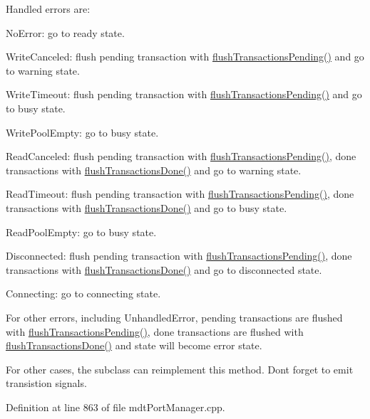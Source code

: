 Handled errors are\-:
\begin{DoxyItemize}
\item No\-Error\-: go to ready state.
\item Write\-Canceled\-: flush pending transaction with \hyperlink{classmdt_port_manager_a85b87522eb9ec9b80ff24e3ad2ef4a00}{flush\-Transactions\-Pending()} and go to warning state.
\item Write\-Timeout\-: flush pending transaction with \hyperlink{classmdt_port_manager_a85b87522eb9ec9b80ff24e3ad2ef4a00}{flush\-Transactions\-Pending()} and go to busy state.
\item Write\-Pool\-Empty\-: go to busy state.
\item Read\-Canceled\-: flush pending transaction with \hyperlink{classmdt_port_manager_a85b87522eb9ec9b80ff24e3ad2ef4a00}{flush\-Transactions\-Pending()}, done transactions with \hyperlink{classmdt_port_manager_aad801de5f93a3619d98b7ea3cae6b999}{flush\-Transactions\-Done()} and go to warning state.
\item Read\-Timeout\-: flush pending transaction with \hyperlink{classmdt_port_manager_a85b87522eb9ec9b80ff24e3ad2ef4a00}{flush\-Transactions\-Pending()}, done transactions with \hyperlink{classmdt_port_manager_aad801de5f93a3619d98b7ea3cae6b999}{flush\-Transactions\-Done()} and go to busy state.
\item Read\-Pool\-Empty\-: go to busy state.
\item Disconnected\-: flush pending transaction with \hyperlink{classmdt_port_manager_a85b87522eb9ec9b80ff24e3ad2ef4a00}{flush\-Transactions\-Pending()}, done transactions with \hyperlink{classmdt_port_manager_aad801de5f93a3619d98b7ea3cae6b999}{flush\-Transactions\-Done()} and go to disconnected state.
\item Connecting\-: go to connecting state.
\end{DoxyItemize}

For other errors, including Unhandled\-Error, pending transactions are flushed with \hyperlink{classmdt_port_manager_a85b87522eb9ec9b80ff24e3ad2ef4a00}{flush\-Transactions\-Pending()}, done transactions are flushed with \hyperlink{classmdt_port_manager_aad801de5f93a3619d98b7ea3cae6b999}{flush\-Transactions\-Done()} and state will become error state.

For other cases, the subclass can reimplement this method. Dont forget to emit transistion signals. 

Definition at line 863 of file mdt\-Port\-Manager.\-cpp.



